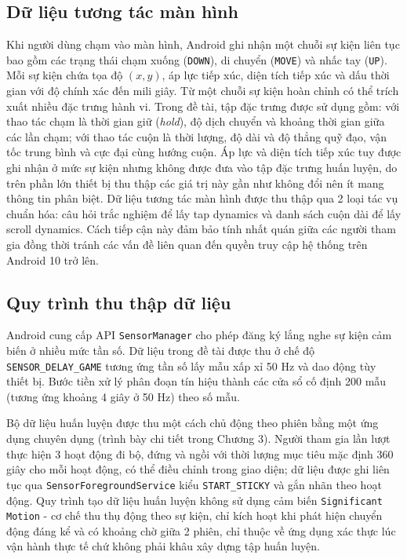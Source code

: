 \documentclass[../DoAn.tex]{subfiles}
\begin{document}
\subsection{Dữ liệu tương tác màn hình}

Khi người dùng chạm vào màn hình, Android ghi nhận một chuỗi sự kiện liên tục bao gồm các trạng thái chạm xuống (\texttt{DOWN}), di chuyển (\texttt{MOVE}) và nhấc tay (\texttt{UP}). Mỗi sự kiện chứa tọa độ $(x, y)$, áp lực tiếp xúc, diện tích tiếp xúc và dấu thời gian với độ chính xác đến mili giây. Từ một chuỗi sự kiện hoàn chỉnh có thể trích xuất nhiều đặc trưng hành vi. Trong đề tài, tập đặc trưng được sử dụng gồm: với thao tác chạm là thời gian giữ (\textit{hold}), độ dịch chuyển và khoảng thời gian giữa các lần chạm; với thao tác cuộn là thời lượng, độ dài và độ thẳng quỹ đạo, vận tốc trung bình và cực đại cùng hướng cuộn. Áp lực và diện tích tiếp xúc tuy được ghi nhận ở mức sự kiện nhưng không được đưa vào tập đặc trưng huấn luyện, do trên phần lớn thiết bị thu thập các giá trị này gần như không đổi nên ít mang thông tin phân biệt. Dữ liệu tương tác màn hình được thu thập qua 2 loại tác vụ chuẩn hóa: câu hỏi trắc nghiệm để lấy tap dynamics và danh sách cuộn dài để lấy scroll dynamics. Cách tiếp cận này đảm bảo tính nhất quán giữa các người tham gia đồng thời tránh các vấn đề liên quan đến quyền truy cập hệ thống trên Android 10 trở lên.

\subsection{Quy trình thu thập dữ liệu}

Android cung cấp API \texttt{SensorManager} cho phép đăng ký lắng nghe sự kiện cảm biến ở nhiều mức tần số. Dữ liệu trong đề tài được thu ở chế độ \\
\texttt{SENSOR\_DELAY\_GAME} tương ứng tần số lấy mẫu xấp xỉ 50 Hz và dao động tùy thiết bị. Bước tiền xử lý phân đoạn tín hiệu thành các cửa sổ cố định 200 mẫu (tương ứng khoảng 4 giây ở 50 Hz) theo số mẫu.

Bộ dữ liệu huấn luyện được thu một cách chủ động theo phiên bằng một ứng dụng chuyên dụng (trình bày chi tiết trong Chương 3). Người tham gia lần lượt thực hiện 3 hoạt động đi bộ, đứng và ngồi với thời lượng mục tiêu mặc định 360 giây cho mỗi hoạt động, có thể điều chỉnh trong giao diện; dữ liệu được ghi liên tục qua \texttt{SensorForegroundService} kiểu \texttt{START\_STICKY} và gắn nhãn theo hoạt động. Quy trình tạo dữ liệu huấn luyện không sử dụng cảm biến \texttt{Significant Motion} - cơ chế thu thụ động theo sự kiện, chỉ kích hoạt khi phát hiện chuyển động đáng kể và có khoảng chờ giữa 2 phiên, chỉ thuộc về ứng dụng xác thực lúc vận hành thực tế chứ không phải khâu xây dựng tập huấn luyện.
\end{document}
